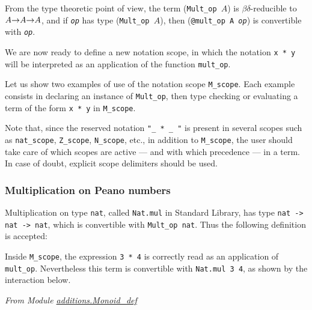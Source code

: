 
From the type theoretic point of view, the term (\texttt{Mult\_op $A$}) is 
$\beta\delta$-reducible to \texttt{$A\mbox{$\rightarrow$} A \mbox{$\rightarrow$} A$}, and
if \texttt{\it op} has type (\texttt{Mult\_op $A$}), then 
(\texttt{@mult\_op A {\it op}}) is convertible with \texttt{\it op}.


We are now ready to define a new notation scope, in which the notation
\texttt{x * y} will be interpreted as an application of the function
\texttt{mult\_op}.


 Let us show two examples of use of the
notation scope \texttt{M\_scope}. Each example consists in declaring an 
instance of \texttt{Mult\_op}, then type checking or evaluating
a term of the form \texttt{x * y} in \texttt{M\_scope}.

Note that, since the reserved notation \texttt{"\_ * \_ "} is 
present in several scopes such as  \texttt{nat\_scope}, \texttt{Z\_scope},
\texttt{N\_scope}, etc., in addition to  \texttt{M\_scope},  the user should
take care of which scopes are active --- and with  which precedence --- in a \gallina{} term.
In case of doubt, explicit scope delimiters should be used.
  




\subsubsection{Multiplication on Peano numbers}

Multiplication  on type \texttt{nat}, called \texttt{Nat.mul} in
Standard Library, has  type \linebreak \texttt{nat -> nat -> nat}, which is
convertible  with \texttt{Mult\_op nat}. Thus the following definition is
accepted:


Inside \texttt{M\_scope}, the expression \texttt{3 * 4} is 
correctly read as an application of \texttt{mult\_op}. Nevertheless 
this term is convertible with \texttt{Nat.mul 3 4}, as shown by the 
interaction below.

\emph{From Module \href{../theories/html/additions.Monoid_def.html}{additions.Monoid\_def}}



